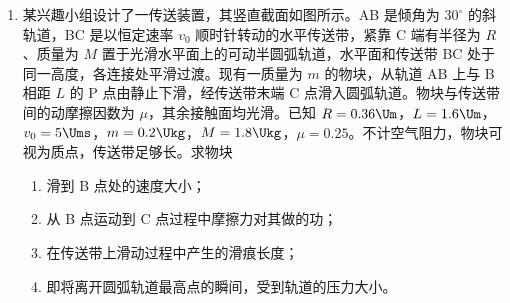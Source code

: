 \documentclass[\gkver]{gaokaozhenti}
\begin{document}
\begin{enumerate}

\item
某兴趣小组设计了一传送装置，其竖直截面如图所示。AB 是倾角为 $30^{\circ}$ 的斜轨道，BC 是以恒定速率 $v_{0}$ 顺时针转动的水平传送带，紧靠 C 端有半径为 $R$、质量为 $M$ 置于光滑水平面上的可动半圆弧轨道，水平面和传送带 BC 处于同一高度，各连接处平滑过渡。现有一质量为 $m$ 的物块，从轨道 AB 上与 B 相距 $L$ 的 P 点由静止下滑，经传送带末端 C 点滑入圆弧轨道。物块与传送带间的动摩擦因数为 $\mu$，其余接触面均光滑。已知 $R = 0.36\Um$，$L = 1.6\Um$，$v_{0} = 5\Ums$，$m = 0.2\Ukg$，$M = 1.8\Ukg$，$\mu = 0.25$。不计空气阻力，物块可视为质点，传送带足够长。求物块


\begin{enumerate}
	\item
	滑到 B 点处的速度大小；
	\item
	从 B 点运动到 C 点过程中摩擦力对其做的功；
	\item
	在传送带上滑动过程中产生的滑痕长度；
	\item
	即将离开圆弧轨道最高点的瞬间，受到轨道的压力大小。
\end{enumerate}


\end{enumerate}
\end{document}
